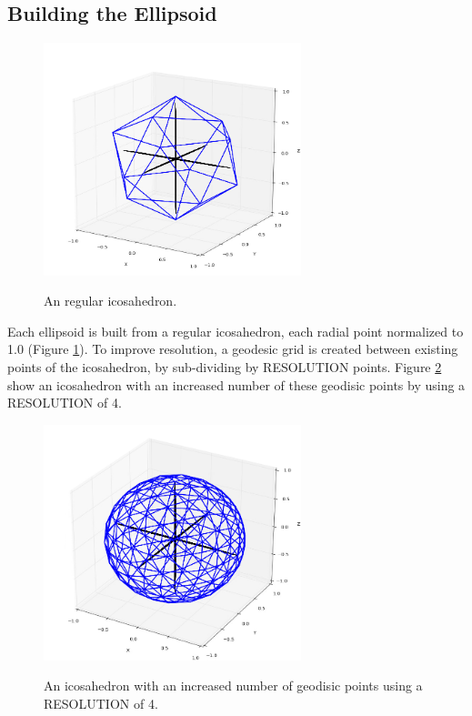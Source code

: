 \documentclass[11pt]{article}
\begin{document}
\subsection{Building the Ellipsoid}
\begin{figure}[h!]
  \caption{An regular icosahedron.}
  \centering
    \includegraphics[width=7.5cm]{icosahedron}
    \label{fig:icosahedron}
\end{figure}

Each ellipsoid is built from a regular icosahedron, each radial point normalized to 1.0 (Figure \ref{fig:icosahedron}). To improve resolution, a geodesic grid is created between existing points of the icosahedron, by sub-dividing by {\footnotesize RESOLUTION} points. Figure \ref{fig:icosahedron2_n4} show an icosahedron with an increased number of these geodisic points by  using a {\footnotesize RESOLUTION} of 4.
\begin{figure}[h!]
  \caption{An icosahedron with an increased number of geodisic points using a {\footnotesize RESOLUTION} of 4.}
  \centering
    \includegraphics[width=7.5cm]{icosahedron2_n4}
    \label{fig:icosahedron2_n4}
\end{figure}
\end{document}
